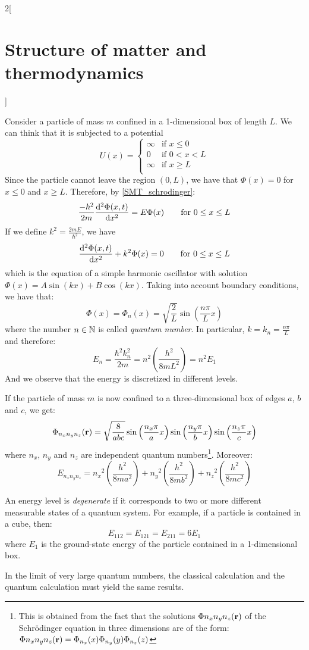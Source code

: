 \documentclass[../../../main_physics.tex]{subfiles}
\begin{document}
\begin{multicols}{2}[\section{Structure of matter and thermodynamics}]
\begin{definition}
  \end{definition}
  \begin{proposition}
    Consider a particle of mass $m$ confined in a 1-dimensional box of length $L$. We can think that it is subjected to a potential $$U(x)=
      \begin{cases}
        \infty & \text{if }x\leq 0   \\
        0      & \text{if }0 < x < L \\
        \infty & \text{if }x\geq L   \\
      \end{cases}
    $$
    Since the particle cannot leave the region $(0,L)$, we have that $\Phi(x)=0$ for $x\leq 0$ and $x\geq L$. Therefore, by \cref{SMT_schrodinger}:
    $$
      \frac{-\hbar^2}{2m}\dv[2]{\Phi(x,t)}{x}=E\Phi(x)\qquad\text{for }0\leq x\leq L
    $$
    If we define $k^2=\frac{2m E}{\hbar^2}$, we have
    $$
      \dv[2]{\Phi(x,t)}{x}+k^2\Phi(x)=0\qquad\text{for }0\leq x\leq L
    $$
    which is the equation of a simple harmonic oscillator with solution $\Phi(x)=A\sin(kx)+B\cos(kx)$. Taking into account boundary conditions, we have that: $$\Phi(x)=\Phi_n(x)=\sqrt{\frac{2}{L}}\sin\left(\frac{n\pi}{L}x\right)$$ where the number $n\in\mathbb{N}$ is called \emph{quantum number}. In particular, $k=k_n=\frac{n\pi}{L}$ and therefore: $$E_n=\frac{\hbar^2k_n^2}{2m}=n^2\left(\frac{h^2}{8mL^2}\right)=n^2E_1$$ And we observe that the energy is discretized in different levels.
  \end{proposition}
  \begin{proposition}
    If the particle of mass $m$ is now confined to a three-dimensional box of edges $a$, $b$ and $c$, we get:
    $$\Phi_{n_xn_yn_z}(\boldsymbol{\mathrm{r}})=\sqrt{\frac{8}{abc}}\sin\left(\frac{n_x\pi}{a}x\right)\sin\left(\frac{n_y\pi}{b}x\right)\sin\left(\frac{n_z\pi}{c}x\right)$$
    where $n_x$, $n_y$ and $n_z$ are independent quantum numbers\footnote{This is obtained from the fact that the solutions $\Phi{n_xn_yn_z}(\boldsymbol{\mathrm{r}})$ of the Schrödinger equation in three dimensions are of the form: $\Phi{n_xn_yn_z}(\boldsymbol{\mathrm{r}})=\Phi_{n_x}(x)\Phi_{n_y}(y)\Phi_{n_z}(z)$}. Moreover:
    $$E_{n_xn_yn_z}={n_x}^2\left(\frac{h^2}{8ma^2}\right)+{n_y}^2\left(\frac{h^2}{8mb^2}\right)+{n_z}^2\left(\frac{h^2}{8mc^2}\right)$$
  \end{proposition}
  \begin{definition}
    An energy level is \emph{degenerate} if it corresponds to two or more different measurable states of a quantum system. For example, if a particle is contained in a cube, then: $$E_{112}=E_{121}=E_{211}=6E_1$$ where $E_1$ is the ground-state energy of the particle contained in a 1-dimensional box.
  \end{definition}
  \begin{proposition}
    In the limit of very large quantum numbers, the classical calculation and the quantum calculation must yield the same results.
  \end{proposition}

\end{multicols}
\end{document}
